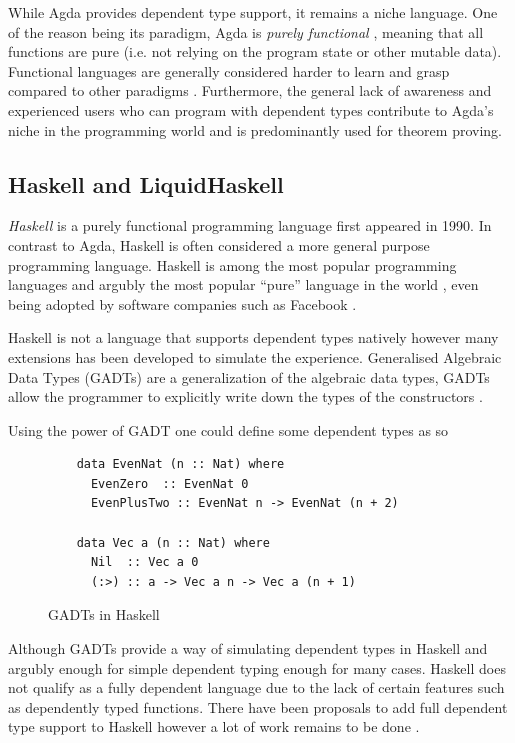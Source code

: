 \documentclass[a4paper,12pt]{report}
\begin{document}
\par
While Agda provides dependent type support, it remains a niche language. One of 
the reason being its paradigm, Agda is \textit{purely functional} \cite{purelyFP}, meaning that 
all functions are pure (i.e. not relying on the program state or other mutable 
data). Functional languages are generally considered harder to learn and grasp 
compared to other paradigms \cite{fpHarder}. Furthermore, the general lack of 
awareness and experienced users who can program with dependent types 
contribute to Agda's niche in the programming world and is 
predominantly used for theorem proving.

\subsection{Haskell and LiquidHaskell}
\textit{Haskell} \cite{haskell} is a purely functional programming language first appeared in 1990. In 
contrast to Agda, Haskell is often considered a more general purpose programming 
language. Haskell is among the most popular programming languages and argubly 
the most popular ``pure'' language in the world \cite{pypl}, even 
being adopted by software companies such as Facebook \cite{haskellFB}.

\par
Haskell is not a language that supports dependent types natively however many 
extensions has been developed to simulate the experience. 
Generalised Algebraic Data Types (GADTs) are a generalization of the 
algebraic data types, GADTs allow the programmer to 
explicitly write down the types of the constructors \cite{haskellGADT}. 

\par
Using the power of GADT one could define some dependent types as so

\begin{figure}[H]
  \begin{lstlisting}      
    data EvenNat (n :: Nat) where
      EvenZero  :: EvenNat 0
      EvenPlusTwo :: EvenNat n -> EvenNat (n + 2)
      
    data Vec a (n :: Nat) where
      Nil  :: Vec a 0
      (:>) :: a -> Vec a n -> Vec a (n + 1)
  \end{lstlisting}
  \caption{GADTs in Haskell}
\end{figure}

\par
Although GADTs provide a way of simulating dependent types in Haskell and 
argubly enough for simple dependent typing enough for many cases. 
Haskell does not qualify as a fully dependent 
language due to the lack of certain features such as dependently typed functions. 
There have been proposals to add full dependent type support to Haskell however a lot 
of work remains to be done \cite{dependentHaskell, aRoleForDependentHaskell}. 
\end{document}
